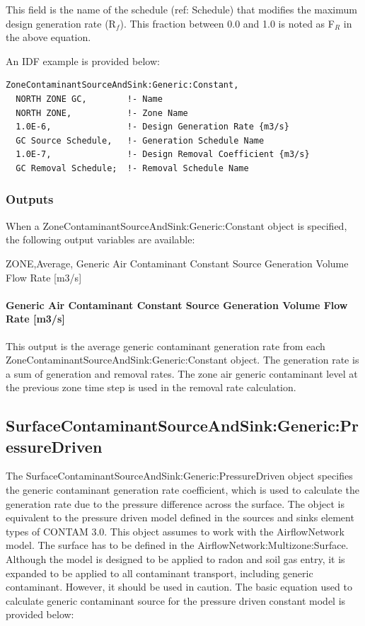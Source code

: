 This field is the name of the schedule (ref: Schedule) that modifies the maximum design generation rate (R\(_{f}\)). This fraction between 0.0 and 1.0 is noted as F\(_{R}\) in the above equation.

An IDF example is provided below:

\begin{lstlisting}
ZoneContaminantSourceAndSink:Generic:Constant,
  NORTH ZONE GC,        !- Name
  NORTH ZONE,           !- Zone Name
  1.0E-6,               !- Design Generation Rate {m3/s}
  GC Source Schedule,   !- Generation Schedule Name
  1.0E-7,               !- Design Removal Coefficient {m3/s}
  GC Removal Schedule;  !- Removal Schedule Name
\end{lstlisting}

\subsubsection{Outputs}\label{outputs-7-004}

When a ZoneContaminantSourceAndSink:Generic:Constant object is specified, the following output variables are available:

ZONE,Average, Generic Air Contaminant Constant Source Generation Volume Flow Rate {[}m3/s{]}

\paragraph{Generic Air Contaminant Constant Source Generation Volume Flow Rate {[}m3/s{]}}\label{generic-air-contaminant-constant-source-generation-volume-flow-rate-m3s}

This output is the average generic contaminant generation rate from each ZoneContaminantSourceAndSink:Generic:Constant object. The generation rate is a sum of generation and removal rates. The zone air generic contaminant level at the previous zone time step is used in the removal rate calculation.

\subsection{Surface\-Contaminant\-Source\-And\-Sink:\-Generic:\-Pressure\-Driven}\label{surfacecontaminantsourceandsinkgenericpressuredriven}

The Surface\-Contaminant\-Source\-And\-Sink:\-Generic:\-Pressure\-Driven object specifies the generic contaminant generation rate coefficient, which is used to calculate the generation rate due to the pressure difference across the surface. The object is equivalent to the pressure driven model defined in the sources and sinks element types of CONTAM 3.0. This object assumes to work with the AirflowNetwork model. The surface has to be defined in the AirflowNetwork:Multizone:Surface. Although the model is designed to be applied to radon and soil gas entry, it is expanded to be applied to all contaminant transport, including generic contaminant. However, it should be used in caution. The basic equation used to calculate generic contaminant source for the pressure driven constant model is provided below:

